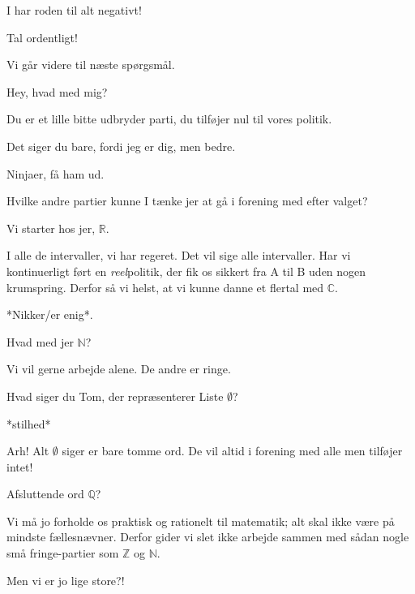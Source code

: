 \documentclass[a4paper,11pt]{article}
\begin{document}
\begin{sketch}
 I har roden til alt negativt!

 Tal ordentligt!


 Vi går videre til næste spørgsmål.

 Hey, hvad med mig?

 Du er et lille bitte udbryder parti, du tilføjer nul til vores politik.

 Det siger du bare, fordi jeg er dig, men bedre.

 Ninjaer, få ham ud.


 Hvilke andre partier kunne I tænke jer at gå i forening med efter valget?

 Vi starter hos jer, \ensuremath{\mathbb{R}}.

 I alle de intervaller, vi har regeret. Det vil sige alle intervaller. Har vi kontinuerligt ført en \textit{reel}politik, der fik os sikkert fra A til B uden nogen krumspring. Derfor så vi helst, at vi kunne danne et flertal med \ensuremath{\mathbb{C}}.

 *Nikker/er enig*.

 Hvad med jer \ensuremath{\mathbb{N}}?

 Vi vil gerne arbejde alene. De andre er ringe. 

 Hvad siger du Tom, der repræsenterer Liste \ensuremath{\emptyset}?

\says{\ensuremath{\emptyset}} *stilhed*

 Arh! Alt \ensuremath{\emptyset} siger er bare tomme ord. De vil altid i forening med alle men tilføjer intet!

 Afsluttende ord \ensuremath{\mathbb{Q}}? 

 Vi må jo forholde os praktisk og rationelt til matematik; alt skal ikke være på mindste fællesnævner. Derfor gider vi slet ikke arbejde sammen med sådan nogle små fringe-partier som \ensuremath{\mathbb{Z}} og \ensuremath{\mathbb{N}}.

 Men vi er jo lige store?!

\end{sketch}
\end{document}
